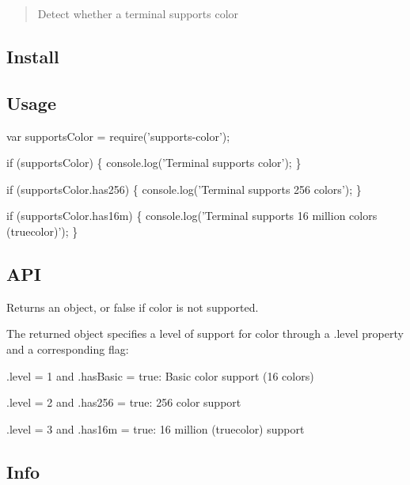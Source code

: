 \begin{quote}
Detect whether a terminal supports color \end{quote}


\subsection*{Install}




\subsection*{Usage}


\begin{DoxyCode}
var supportsColor = require('supports-color');

if (supportsColor) \{
    console.log('Terminal supports color');
\}

if (supportsColor.has256) \{
    console.log('Terminal supports 256 colors');
\}

if (supportsColor.has16m) \{
    console.log('Terminal supports 16 million colors (truecolor)');
\}
\end{DoxyCode}


\subsection*{A\+PI}

Returns an {\ttfamily object}, or {\ttfamily false} if color is not supported.

The returned object specifies a level of support for color through a {\ttfamily .level} property and a corresponding flag\+:


\begin{DoxyItemize}
\item {\ttfamily .level = 1} and {\ttfamily .has\+Basic = true}\+: Basic color support (16 colors)
\item {\ttfamily .level = 2} and {\ttfamily .has256 = true}\+: 256 color support
\item {\ttfamily .level = 3} and {\ttfamily .has16m = true}\+: 16 million (truecolor) support
\end{DoxyItemize}

\subsection*{Info}

